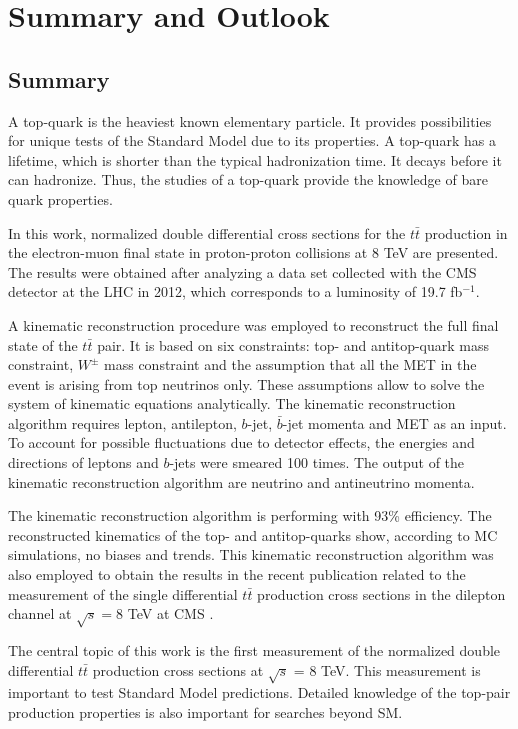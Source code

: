 \chapter{Summary and Outlook}\label{chapt:conc}

\section{Summary}

A top-quark is the heaviest known elementary particle. It provides possibilities for unique tests of the Standard
Model due to its properties. A top-quark has a lifetime, which is shorter than the typical hadronization time.
It decays before it can hadronize. Thus, the studies of a top-quark provide the knowledge of bare quark 
properties.

In this work, normalized double differential cross sections for the $t\bar{t}$ production in the electron-muon final state 
in proton-proton collisions at 8 TeV are presented.
The results were obtained after analyzing a data set collected with the CMS detector at the LHC in 2012, which corresponds to a 
luminosity of 19.7 fb$^{-1}$.

A kinematic reconstruction procedure was employed to reconstruct the full final state of the $t\bar{t}$ pair. It is based on six constraints:
top- and antitop-quark mass constraint, $W^{\pm}$ mass constraint and the assumption that all the MET in the event is arising
from top neutrinos only. These assumptions allow to solve the system of kinematic equations analytically. The kinematic reconstruction
algorithm requires lepton, antilepton, $b$-jet, $\bar{b}$-jet momenta and MET as an input. To account for possible fluctuations due 
to detector effects, the energies and directions of leptons and $b$-jets were smeared 100 times. The output of the kinematic reconstruction
algorithm are neutrino and antineutrino momenta.

The kinematic reconstruction algorithm is performing with 93\% efficiency. The reconstructed kinematics of the top- and antitop-quarks
show, according to MC simulations, no biases and trends. This kinematic reconstruction algorithm was also employed to obtain the 
results in the recent publication related
to the measurement of the single differential $t\bar{t}$ production cross sections in the dilepton channel at $\sqrt{s} = $8 TeV
at CMS \cite{Khachatryan:2015oqa}.

The central topic of this work is the first measurement of the normalized double differential $t\bar{t}$ production cross 
sections at $\sqrt{s}$ = 8 TeV. This measurement is important to test Standard Model predictions. Detailed knowledge of the 
top-pair production properties is also important for searches beyond SM.

